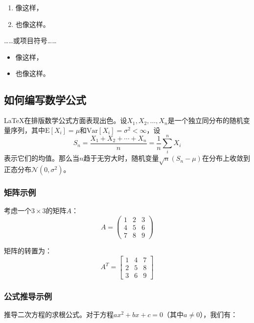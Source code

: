 \documentclass{article}
\begin{document}
\begin{enumerate}
      \item 像这样，
      \item 也像这样。
\end{enumerate}
……或项目符号……
\begin{itemize}
      \item 像这样，
      \item 也像这样。
\end{itemize}

\subsection{如何编写数学公式}

\LaTeX{}在排版数学公式方面表现出色。设$X_1, X_2, \ldots, X_n$是一个独立同分布的随机变量序列，其中$\text{E}[X_i] = \mu$和$\text{Var}[X_i] = \sigma^2 < \infty$，设
\[S_n = \frac{X_1 + X_2 + \cdots + X_n}{n}
      = \frac{1}{n}\sum_{i}^{n} X_i\]
表示它们的均值。那么当$n$趋于无穷大时，随机变量$\sqrt{n}(S_n - \mu)$在分布上收敛到正态分布$\mathcal{N}(0, \sigma^2)$。

\subsubsection{矩阵示例}

考虑一个$3 \times 3$的矩阵$A$：
\[A = \begin{pmatrix}
            1 & 2 & 3 \\
            4 & 5 & 6 \\
            7 & 8 & 9
      \end{pmatrix}\]

矩阵的转置为：
\[A^T = \begin{bmatrix}
            1 & 4 & 7 \\
            2 & 5 & 8 \\
            3 & 6 & 9
      \end{bmatrix}\]

\subsubsection{公式推导示例}

推导二次方程的求根公式。对于方程$ax^2 + bx + c = 0$（其中$a \neq 0$），我们有：
\end{document}
